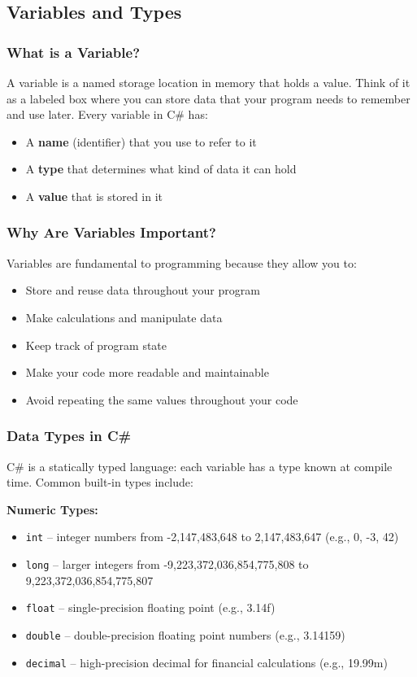\documentclass{article}
\begin{document}
\subsection{Variables and Types}

\subsubsection{What is a Variable?}
A variable is a named storage location in memory that holds a value. Think of it as a labeled box where you can store data that your program needs to remember and use later. Every variable in C\# has:

\begin{itemize}
    \item A \textbf{name} (identifier) that you use to refer to it
    \item A \textbf{type} that determines what kind of data it can hold
    \item A \textbf{value} that is stored in it
\end{itemize}

\subsubsection{Why Are Variables Important?}
Variables are fundamental to programming because they allow you to:
\begin{itemize}
    \item Store and reuse data throughout your program
    \item Make calculations and manipulate data
    \item Keep track of program state
    \item Make your code more readable and maintainable
    \item Avoid repeating the same values throughout your code
\end{itemize}

\subsubsection{Data Types in C\#}
C\# is a statically typed language: each variable has a type known at compile time. Common built-in types include:

\textbf{Numeric Types:}
\begin{itemize}
    \item \texttt{int} -- integer numbers from -2,147,483,648 to 2,147,483,647 (e.g., 0, -3, 42)
    \item \texttt{long} -- larger integers from -9,223,372,036,854,775,808 to 9,223,372,036,854,775,807
    \item \texttt{float} -- single-precision floating point (e.g., 3.14f)
    \item \texttt{double} -- double-precision floating point numbers (e.g., 3.14159)
    \item \texttt{decimal} -- high-precision decimal for financial calculations (e.g., 19.99m)
\end{itemize}
\end{document}
